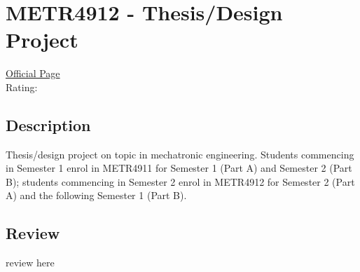 \hypertarget{METR4912}{\section{METR4912 - Thesis/Design Project}}

\large
\textcolor{turbo_purple}{\href{https://my.uq.edu.au/programs-courses/course.html?course_code=METR4912}{Official Page}} \\
Rating: \cstar\cstar\cstar\cstar\ostar

\normalsize
\subsection*{Description}
Thesis/design project on topic in mechatronic engineering.
Students commencing in Semester 1 enrol in METR4911 for Semester 1 (Part A) and Semester 2 (Part B); students commencing in Semester 2 enrol in METR4912 for Semester 2 (Part A) and the following Semester 1 (Part B).

\subsection*{Review}
review here
